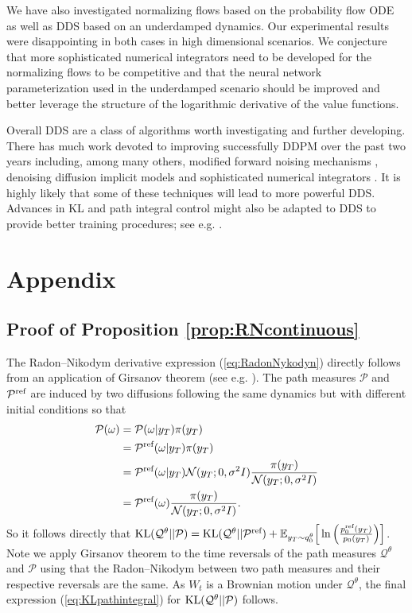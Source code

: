 \documentclass{article} %
\begin{document}
We have also investigated normalizing flows based on the probability flow ODE as well as DDS based on an underdamped dynamics. Our experimental results were disappointing in both cases in high dimensional scenarios. We conjecture that more sophisticated numerical integrators need to be developed for the normalizing flows to be competitive and that the neural network parameterization used in the underdamped scenario should be improved and better leverage the structure of the logarithmic derivative of the  value functions.   

Overall DDS are a class of algorithms worth investigating and further developing. There has much work devoted to improving successfully DDPM over the past two years including, among many others, modified forward noising mechanisms \citep{hoogeboom2022blurring}, denoising diffusion implicit models \citep{song2020denoising} and sophisticated numerical integrators \citep{karras2022elucidating}. It is highly likely that some of these techniques will lead to more powerful DDS. Advances in KL and path integral control might also be adapted to DDS to provide better training procedures; see e.g. \cite{thalmeier2020adaptive}.  




\appendix

\section{Appendix}
\subsection{Proof of Proposition \ref{prop:RNcontinuous}}
The Radon--Nikodym derivative expression (\ref{eq:RadonNykodyn}) directly follows from an application of Girsanov theorem (see e.g. \cite{klebaner2012introduction}).
The path measures $\mathcal{P}$ and $\mathcal{P}^{\textup{ref}}$ are induced by two diffusions following the same dynamics but with different initial conditions so that
\begin{align*}
    \mathcal{P}(\omega)&=\mathcal{P}(\omega|y_T)\pi(y_T)\\
                     &=\mathcal{P}^{\textup{ref}}(\omega|y_T)\pi(y_T)\\
                     &=\mathcal{P}^{\textup{ref}}(\omega|y_T)\mathcal{N}(y_T;0,\sigma^2I)\frac{\pi(y_T)}{\mathcal{N}(y_T;0,\sigma^2I)}\\ &=\mathcal{P}^{\textup{ref}}(\omega)\frac{\pi(y_T)}{\mathcal{N}(y_T;0,\sigma^2I)}.
\end{align*}
So it follows directly that  $\mathrm{KL}(\mathcal{Q}^\theta||\mathcal{P})=\mathrm{KL}(\mathcal{Q}^\theta||\mathcal{P}^{\textup{ref}})+\mathbb{E}_{y_T \sim q^{\theta}_0}\Bigr[\ln \left(\frac{p^{\textup{ref}}_0(y_T)}{p_0(y_T)}\right)\Bigr]$. Note we apply Girsanov theorem to the time reversals of the path measures $\mathcal{Q}^\theta$ and $\mathcal{P}$ using that the Radon--Nikodym between two path measures and their respective reversals are the same. As $W_t$ is a Brownian motion under $\mathcal{Q}^\theta$, the final expression (\ref{eq:KLpathintegral}) for $\mathrm{KL}(\mathcal{Q}^\theta||\mathcal{P})$ follows. 
\end{document}
